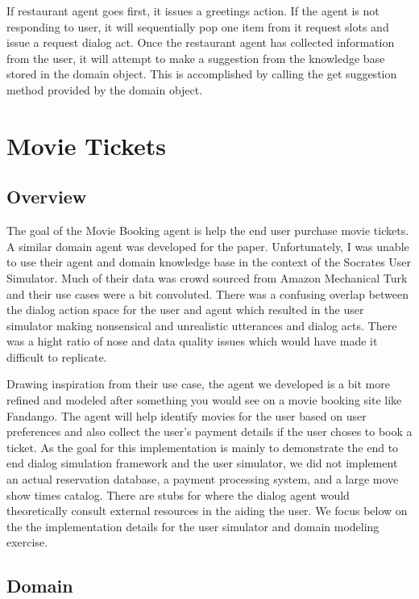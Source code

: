 If restaurant agent goes first, it issues a greetings action. If the agent is not responding to user, it will sequentially pop one item from it request slots and issue a request dialog act. Once the restaurant agent has collected information from the user, it will attempt to make a suggestion from the knowledge base stored in the domain object. This is accomplished by calling the get suggestion method provided by the domain object.

\section{Movie Tickets}

\subsection{Overview}
The goal of the Movie Booking agent is help the end user purchase movie tickets. A similar domain agent was developed for the \cite{li_usersim} paper. Unfortunately, I was unable to use their agent and domain knowledge base in the context of the Socrates User Simulator. Much of their data was crowd sourced from Amazon Mechanical Turk and their use cases were a bit convoluted. There was a confusing overlap between the dialog action space for the user and agent which resulted in the user simulator making nonsensical and unrealistic utterances and dialog acts. There was a hight ratio of nose and data quality issues which would have made it difficult to replicate.  

Drawing inspiration from their use case, the agent we developed is a bit more refined and modeled after something you would see on a movie booking site like Fandango. The agent will help identify movies for the user based on user preferences and also collect the user's payment details if the user choses to book a ticket. As the goal for this implementation is mainly to demonstrate the end to end dialog simulation framework and the user simulator, we did not implement an actual reservation database, a payment processing system, and a large move show times catalog. There are stubs for where the dialog agent would theoretically consult external resources in the aiding the user. We focus below on the the implementation details for the user simulator and domain modeling exercise.  

\subsection{Domain}

